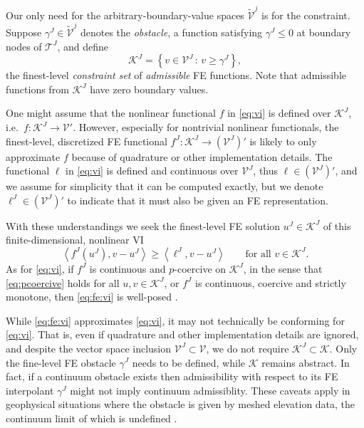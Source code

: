 \documentclass[letterpaper,final,12pt,reqno]{amsart}
\theoremstyle{cstyle}
\theoremstyle{cstyle*}
\theoremstyle{dstyle}
\numberwithin{equation}{section}
\numberwithin{figure}{section}
\numberwithin{table}{section}
\numberwithin{theorem}{section}
\newcommand{\cK}{\mathcal{K}}
\newcommand{\ip}[2]{\left<#1,#2\right>}
\begin{document}
Our only need for the arbitrary-boundary-value spaces $\tilde{\mathcal{V}}^j$ is for the constraint.  Suppose $\gamma^J \in \tilde{\mathcal{V}}^j$ denotes the \emph{obstacle}, a function satisfying $\gamma^J \le 0$ at boundary nodes of $\mathcal{T}^J$, and define
\begin{equation}
\mathcal{K}^J = \left\{v \in \mathcal{V}^J\,:\,v \ge \gamma^J\right\}, \label{eq:fineconstraintset}
\end{equation}
the finest-level \emph{constraint set} of \emph{admissible} FE functions.  Note that admissible functions from $\mathcal{K}^J$ have zero boundary values.

One might assume that the nonlinear functional $f$ in \eqref{eq:vi} is defined over $\mathcal{K}^J$, i.e.~$f:\mathcal{K}^J \to \mathcal{V}'$.  However, especially for nontrivial nonlinear functionals, the finest-level, discretized FE functional $f^J:\mathcal{K}^J \to (\mathcal{V}^J)'$ is likely to only approximate $f$ because of quadrature or other implementation details.  The functional $\ell$ in \eqref{eq:vi} is defined and continuous over $\mathcal{V}^J$, thus $\ell\in (\mathcal{V}^J)'$, and we assume for simplicity that it can be computed exactly, but we denote $\ell^J \in (\mathcal{V}^J)'$ to indicate that it must also be given an FE representation.

With these understandings we seek the finest-level FE solution $u^J \in \mathcal{K}^J$ of this finite-dimensional, nonlinear VI
\begin{equation}
\ip{f^J(u^J)}{v-u^J} \ge \ip{\ell^J}{v-u^J} \qquad \text{for all } v\in \cK^J. \label{eq:fe:vi}
\end{equation}
As for \eqref{eq:vi}, if $f^J$ is continuous and $p$-coercive on $\mathcal{K}^J$, in the sense that \eqref{eq:pcoercive} holds for all $u,v \in \mathcal{K}^J$, or $f^J$ is continuous, coercive and strictly monotone, then \eqref{eq:fe:vi} is well-posed \cite{KinderlehrerStampacchia1980}.

While \eqref{eq:fe:vi} approximates \eqref{eq:vi}, it may not technically be conforming for \eqref{eq:vi}.  That is, even if quadrature and other implementation details are ignored, and despite the vector space inclusion $\mathcal{V}^J \subset \mathcal{V}$, we do not require $\mathcal{K}^J \subset \mathcal{K}$.  Only the fine-level FE obstacle $\gamma^J$ needs to be defined, while $\mathcal{K}$ remains abstract.  In fact, if a continuum obstacle exists then admissibility with respect to its FE interpolant $\gamma^J$ might not imply continuum admissiblity.  These caveats apply in geophysical situations where the obstacle is given by meshed elevation data, the continuum limit of which is undefined \cite{Bueler2016}.
\end{document}
